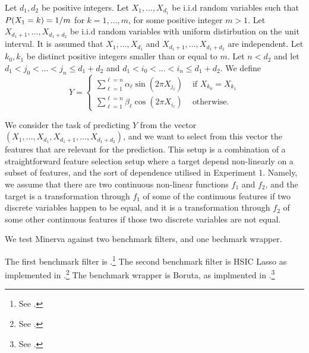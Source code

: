 Let 
$d_1, d_2$
be positive integers.
Let
$X_1, \dots, X_{d_1}$
be i.i.d random variables
such that
${{P}}(X_1 = k) = 1/m$
for $k=1, \dots, m$,
for some positive integer 
$m > 1$.
Let 
$X_{d_1 + 1}, \dots, X_{d_1 + d_2}$
be i.i.d random variables with uniform distirbution on the unit interval. 
It is assumed that 
$X_1, \dots, X_{d_1}$
and
$X_{d_1 + 1}, \dots, X_{d_1 + d_2}$
are independent. 
Let 
$k_0, k_1$
be distinct positive integers 
smaller than or equal to
$m$.
Let 
$n < d_2$
and 
let
$d_1 < j_0 <  \dots < j_n \leq d_1 + d_2$
and
$d_1 < i_0 <  \dots < i_n \leq d_1 + d_2$.
We define
\begin{equation}
	\label{eq.exp2target}
	Y 
	=
	\begin{cases}
		\sum_{\ell = 1}^{\ell=n} \alpha_\ell \sin\left(2\pi X_{j_\ell}\right)  
		& \text{ if } X_{k_0} = X_{k_1}
		\\
		\sum_{\ell = 1}^{\ell=n} \beta_\ell \cos\left(2\pi X_{i_\ell}\right)  
		& \text{ otherwise}.
	\end{cases}
\end{equation}



We consider the task of predicting $Y$ from the vector 
$(X_1, \dots, X_{d_1}, X_{d_1 + 1}, \dots, X_{d_1 + d_2})$,
and 
we want to select 
from this vector 
the features that are relevant for the prediction.
This setup is a combination of a 
straightforward feature selection setup 
where a target depend non-linearly on a subset of features,
and 
the sort of dependence utilised in Experiment 1.
Namely,
we assume that 
there are two continuous non-linear functions $f_1$ and $f_2$,
and
the target is a transformation through $f_1$
of some of the continuous features if two discrete  variables happen to be equal,
and it is a transformation through $f_2$
of some other continuous features if those two discrete variables are not equal. 

We test 
Minerva
against two benchmark filters, 
and one bechmark wrapper.

The first benchmark filter is 
.\footnote{
See
.
}
The second benchmark filter is
HSIC Lasso
as implemented in 
.\footnote{
See .
}
The benchmark wrapper is Boruta,
as implmented in
.\footnote{
See
.
}



